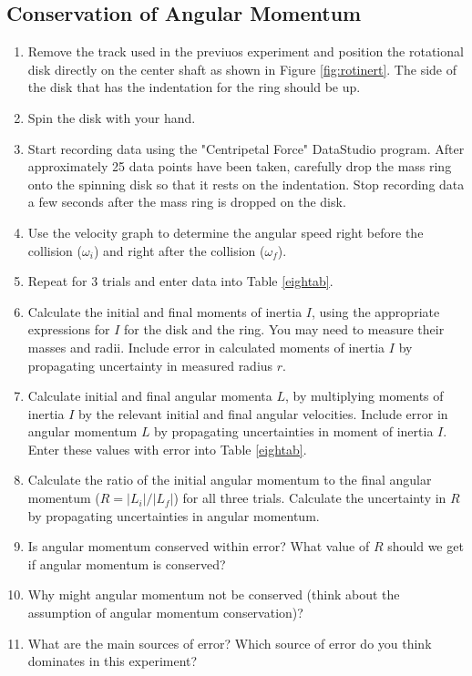 \subsection{Conservation of Angular Momentum}
\label{diskinert}
\begin{enumerate}
	\item Remove the track used in the previuos experiment and position the rotational disk directly on the center shaft as shown in Figure \ref{fig:rotinert}.  The side of the disk that has the indentation for the ring should be up.
	\item Spin the disk with your hand.
	\item Start recording data using the "Centripetal Force" DataStudio program.  After approximately 25 data points have been taken, carefully drop the mass ring onto the spinning disk so that it rests on the indentation. Stop recording data a few seconds after the mass ring is dropped on the disk.
	\item Use the velocity graph to determine the angular speed right before the collision ($\omega _{i}$) and right after the collision ($\omega _{f}$).  
	\item Repeat for 3 trials and enter data into Table \ref{eightab}.
	\item Calculate the initial and final moments of inertia $I$, using the appropriate expressions for $I$ for the disk and the ring. You may need to measure their masses and radii. Include error in calculated moments of inertia $I$ by propagating uncertainty in measured radius $r$.
	\item Calculate initial and final angular momenta $L$, by multiplying moments of inertia $I$ by the relevant initial and final angular velocities. Include error in angular momentum $L$ by propagating uncertainties in moment of inertia $I$. Enter these values with error into Table \ref{eightab}. 
	\item Calculate the ratio of the initial angular momentum to the final angular momentum ($R = |L_i| /|L_f|$) for all three trials. Calculate the uncertainty in $R$ by propagating uncertainties in angular momentum.
	\item Is angular momentum conserved within error? What value of $R$ should we get if angular momentum is conserved? 
	\item Why might angular momentum not be conserved (think about the assumption of angular momentum conservation)?
	\item  What are the main sources of error? Which source of error do you think dominates in this experiment?
\end{enumerate}

